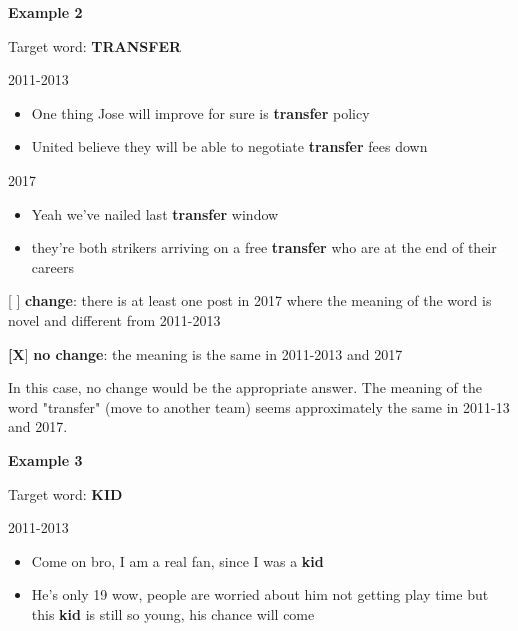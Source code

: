 \documentclass[11pt,a4paper]{article}
\begin{document}
\begin{minipage}{15cm}

\textbf{Example 2}

\vspace*{0.5cm}

Target word: \textbf{TRANSFER}

\vspace*{0.25cm}
2011-2013
\begin{itemize}
\item One thing Jose will improve for sure is \textbf{transfer} policy
\item United believe they will be able to negotiate \textbf{transfer} fees down
\end{itemize}

\vspace*{0.25cm}

2017
\begin{itemize}
\item Yeah we've nailed last \textbf{transfer} window
\item they're both strikers arriving on a free \textbf{transfer} who are at the end of their careers
\end{itemize}

\vspace*{0.25cm}

[  ] \textbf{change}: there is at least one post in 2017 where the meaning of the word is novel and different from 2011-2013

\textbf{[X}]  \textbf{no change}: the meaning is the same in 2011-2013 and 2017

\vspace*{0.25cm}

In this case, no change would be the appropriate answer. The meaning of the word "transfer" (move to another team) seems approximately the same in 2011-13 and 2017.

\vspace*{1.5cm}

\textbf{Example 3}

\vspace*{0.5cm}

Target word: \textbf{KID}

\vspace*{0.25cm}
2011-2013
\begin{itemize}
\item Come on bro, I am a real fan, since I was a \textbf{kid}
\item He's only 19 wow, people are worried about him not getting play time but this \textbf{kid} is still so young, his chance will come
\end{itemize}


\end{minipage}
\end{document}
